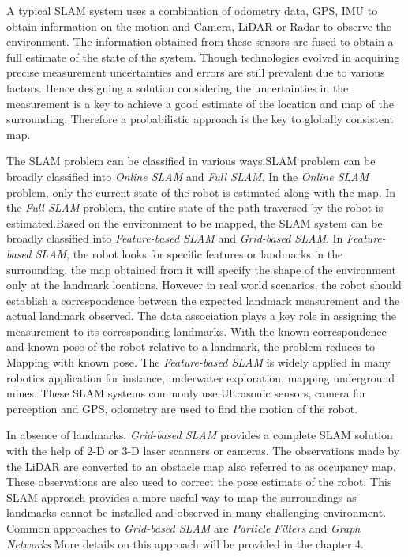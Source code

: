 A typical SLAM system uses a combination of odometry data, GPS, IMU to obtain information on the motion and Camera, LiDAR or Radar to observe the environment. The information obtained from these sensors are fused to obtain a full estimate of the state of the system. Though technologies evolved in acquiring precise measurement uncertainties and errors are still prevalent due to various factors. Hence designing a solution considering the uncertainties in the measurement is a key to achieve a good estimate of the location and map of the surrounding. Therefore a probabilistic approach is the key to globally consistent map.

The SLAM problem can be classified in various ways.SLAM problem can be broadly classified into \textit{Online SLAM} and \textit{Full SLAM}. In the \textit{Online SLAM} problem, only the current state of the robot is estimated along with the map. In the \textit{Full SLAM} problem, the entire state of the path traversed by the robot is estimated.Based on the environment to be mapped, the SLAM system can be broadly classified into \textit{Feature-based SLAM} and \textit{Grid-based SLAM}. In \textit{Feature-based SLAM}, the robot looks for specific features or landmarks in the surrounding, the map obtained from it will specify the shape of the environment only at the landmark locations. However in real world scenarios, the robot should establish a correspondence between the expected landmark measurement and the actual landmark observed. The data association plays a key role in assigning the measurement to  its corresponding landmarks. With the known correspondence and known pose of the robot relative to a landmark, the problem reduces to Mapping with known pose. The \textit{Feature-based SLAM} is widely applied in many robotics application for instance, underwater exploration\cite{6678293}, mapping underground mines. These SLAM systems commonly use Ultrasonic sensors, camera for perception and GPS, odometry are used to find the motion of the robot.

In absence of landmarks, \textit{Grid-based SLAM} provides a complete SLAM solution with the help of 2-D or 3-D laser scanners or cameras. The observations made by the LiDAR are converted to an obstacle map also referred to as occupancy map. These observations are also used to correct the pose estimate of the robot. This SLAM approach provides a more useful way to map the surroundings as landmarks cannot be installed and observed in many challenging environment. Common approaches to \textit{Grid-based SLAM} are \textit{Particle Filters} and \textit{Graph Networks} More details on this approach will be provided in the chapter 4.

